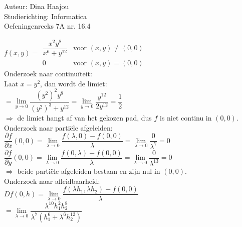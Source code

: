 \documentclass[a4paper]{article}
\begin{document}
\normalsize

\noindent \large Auteur: Dina Haajou \\
\noindent \large Studierichting: Informatica \\
\noindent \large Oefeningenreeks 7A nr. 16.4 \\

\medskip

\normalsize

$f(x,y) = 
\left.
\begin{array}{rl}
\dfrac{x^2 y^8}{x^6 + y^{12}} & \text{voor } (x,y) \neq (0,0) \\
0 & \text{voor } (x,y) = (0,0)
\end{array}
\right.$ \\

Onderzoek naar continuïteit: \\

Laat $x = y^2$, dan wordt de limiet: \\

$= \lim\limits_{y \to 0} \dfrac{(y^2)^2 y^8}{(y^2)^3 + y^{12}} = \lim\limits_{y \to 0} \dfrac{y^{12}}{2y^{12}} = \dfrac{1}{2}$ \\

$\Rightarrow$ de limiet hangt af van het gekozen pad, dus $f$ is niet continu in $(0,0)$. \\

Onderzoek naar partiële afgeleiden: \\

$\dfrac{\partial f}{\partial x}(0,0) = \lim\limits_{\lambda \to 0} \dfrac{f(\lambda, 0) - f(0,0)}{\lambda} = \lim\limits_{\lambda \to 0} \dfrac{0}{\lambda^7} = 0$ \\

$\dfrac{\partial f}{\partial y}(0,0) = \lim\limits_{\lambda \to 0} \dfrac{f(0, \lambda) - f(0,0)}{\lambda} = \lim\limits_{\lambda \to 0} \dfrac{0}{\lambda^{13}} = 0$ \\

$\Rightarrow$ beide partiële afgeleiden bestaan en zijn nul in $(0,0)$. \\

Onderzoek naar afleidbaarheid: \\

$Df(0,h) = \lim\limits_{\lambda \to 0} \dfrac{f(\lambda h_1, \lambda h_2) - f(0,0)}{\lambda}$ \\

$= \lim\limits_{\lambda \to 0} \dfrac{\lambda^{10} h_1^2 h_2^8}{\lambda^7 (h_1^6 + \lambda^6 h_2^{12})}$ \\
\end{document}

